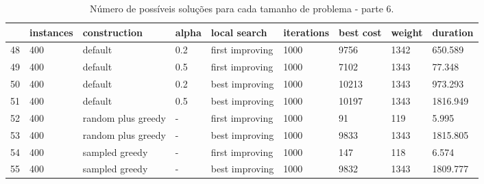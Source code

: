 \begin{landscape}
    \begin{table}
    \centering
    \begin{tabular}{lllllllll}
    \toprule
    {} & instances &        construction & alpha &     local search & iterations & best cost & weight &  duration \\
    \midrule
    48 &       400 &             default &   0.2 &  first improving &       1000 &      9756 &   1342 &   650.589 \\
    49 &       400 &             default &   0.5 &  first improving &       1000 &      7102 &   1343 &    77.348 \\
    50 &       400 &             default &   0.2 &   best improving &       1000 &     10213 &   1343 &   973.293 \\
    51 &       400 &             default &   0.5 &   best improving &       1000 &     10197 &   1343 &  1816.949 \\
    52 &       400 &  random plus greedy &     - &  first improving &       1000 &        91 &    119 &     5.995 \\
    53 &       400 &  random plus greedy &     - &   best improving &       1000 &      9833 &   1343 &  1815.805 \\
    54 &       400 &      sampled greedy &     - &  first improving &       1000 &       147 &    118 &     6.574 \\
    55 &       400 &      sampled greedy &     - &   best improving &       1000 &      9832 &   1343 &  1809.777 \\
    \bottomrule
    \end{tabular}
    \caption{Número de possíveis soluções para cada tamanho de problema - parte 6.}
    \label{table:all-data-6}
    \end{table}

    \end{landscape}
